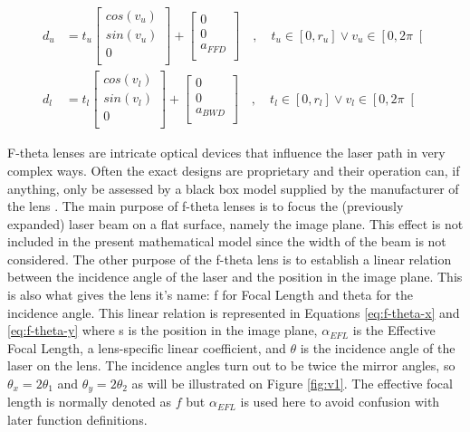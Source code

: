 \begin{align}
    d_u &=
    t_u
    \begin{bmatrix}
        cos(v_u) \\
        sin(v_u) \\
        0 \\
    \end{bmatrix}
    +
    \begin{bmatrix}
        0 \\
        0  \\
        a_{FFD} \\
    \end{bmatrix}
    \quad , \quad
    t_u \in \left[0, r_u\right] \vee 
    v_u \in \left[0, 2\pi\right[
    \label{eq:du} \\
    d_l &=
    t_l
    \begin{bmatrix}
        cos(v_l) \\
        sin(v_l) \\
        0 \\
    \end{bmatrix}
    +
    \begin{bmatrix}
        0 \\
        0  \\
        a_{BWD} \\
    \end{bmatrix}
    \quad , \quad
    t_l \in \left[0, r_l\right] \vee 
    v_l \in \left[0, 2\pi\right[
    \label{eq:dl}
\end{align}

F-theta lenses are intricate optical devices that influence the laser path in very complex ways. Often the exact designs are proprietary and their operation can, if anything, only be assessed by a black box model supplied by the manufacturer of the lens \cite{thorlabs-ftheta}. The main purpose of f-theta lenses is to focus the (previously expanded) laser beam on a flat surface, namely the image plane. This effect is not included in the present mathematical model since the width of the beam is not considered. The other purpose of the f-theta lens is to establish a linear relation between the incidence angle of the laser and the position in the image plane. This is also what gives the lens it's name: f for Focal Length and theta for the incidence angle. This linear relation is represented in Equations \ref{eq:f-theta-x} and \ref{eq:f-theta-y} where s is the position in the image plane, $\alpha_{EFL}$ is the Effective Focal Length, a lens-specific linear coefficient, and $\theta$ is the incidence angle of the laser on the lens. The incidence angles turn out to be twice the mirror angles, so $\theta_x = 2\theta_1$ and $\theta_y = 2\theta_2$ as will be illustrated on Figure \ref{fig:v1}. The effective focal length is normally denoted as $f$ but $\alpha_{EFL}$ is used here to avoid confusion with later function definitions.

